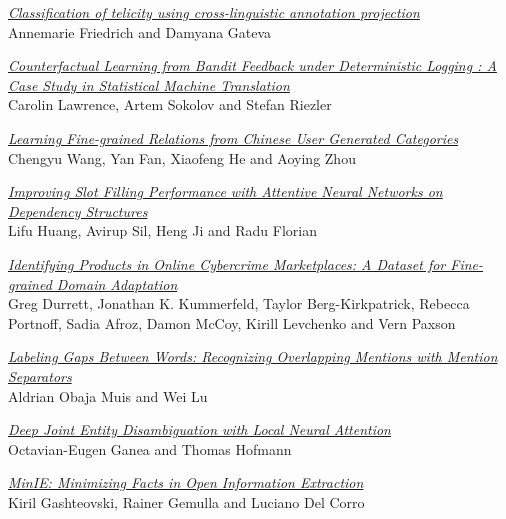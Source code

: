 \hyperlink{page.2542}{\em Classification of telicity using cross-linguistic annotation projection}\samepage \\
\hspace*{7mm} Annemarie Friedrich and Damyana Gateva\dotfill {}

\hyperlink{page.2549}{\em Counterfactual Learning from Bandit Feedback under Deterministic Logging : A Case Study in Statistical Machine Translation}\samepage \\
\hspace*{7mm} Carolin Lawrence, Artem Sokolov and Stefan Riezler\dotfill {}

\hyperlink{page.2560}{\em Learning Fine-grained Relations from Chinese User Generated Categories}\samepage \\
\hspace*{7mm} Chengyu Wang, Yan Fan, Xiaofeng He and Aoying Zhou\dotfill {}

\hyperlink{page.2571}{\em Improving Slot Filling Performance with Attentive Neural Networks on Dependency Structures}\samepage \\
\hspace*{7mm} Lifu Huang, Avirup Sil, Heng Ji and Radu Florian\dotfill {}

\hyperlink{page.2581}{\em Identifying Products in Online Cybercrime Marketplaces: A Dataset for Fine-grained Domain Adaptation}\samepage \\
\hspace*{7mm} Greg Durrett, Jonathan K. Kummerfeld, Taylor Berg-Kirkpatrick, Rebecca Portnoff, Sadia Afroz, Damon McCoy, Kirill Levchenko and Vern Paxson\dotfill {}

\hyperlink{page.2591}{\em Labeling Gaps Between Words: Recognizing Overlapping Mentions with Mention Separators}\samepage \\
\hspace*{7mm} Aldrian Obaja Muis and Wei Lu\dotfill {}

\hyperlink{page.2602}{\em Deep Joint Entity Disambiguation with Local Neural Attention}\samepage \\
\hspace*{7mm} Octavian-Eugen Ganea and Thomas Hofmann\dotfill {}

\hyperlink{page.2613}{\em MinIE: Minimizing Facts in Open Information Extraction}\samepage \\
\hspace*{7mm} Kiril Gashteovski, Rainer Gemulla and Luciano Del Corro\dotfill {}

